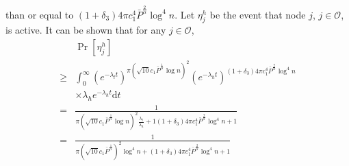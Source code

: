 \documentclass[english]{IEEEtran}
\theoremstyle{plain}
\theoremstyle{plain}
\theoremstyle{plain}
\theoremstyle{remark}
\begin{document}
than or equal to $\left(1+\delta_{3}\right)4\pi c_{1}^{4}\bar{P}^{\frac{2}{\alpha}}\log^{4}n$.
Let $\eta_{j}^{h}$ be the event that node $j$, $j\in\mathcal{O}$,
is active. It can be shown that for any $j\in\mathcal{O}$,
\begin{align}
 & \Pr\left[\eta_{j}^{h}\right]\nonumber \\
\geq & \int_{0}^{\infty}\left(e^{-\lambda_{l}t}\right)^{\pi\left(\sqrt{10}c_{1}\bar{P}^{\frac{1}{\alpha}}\log n\right)^{2}}\left(e^{-\lambda_{h}t}\right)^{\left(1+\delta_{3}\right)4\pi c_{1}^{4}\bar{P}^{\frac{2}{\alpha}}\log^{4}n}\nonumber \\
 & \times\lambda_{h}e^{-\lambda_{h}t}\mathrm{d}t\nonumber \\
= & \frac{1}{\pi\left(\sqrt{10}c_{1}\bar{P}^{\frac{1}{\alpha}}\log n\right)^{2}\frac{\lambda_{l}}{\lambda_{h}}+1\left(1+\delta_{3}\right)4\pi c_{1}^{4}\bar{P}^{\frac{2}{\alpha}}\log^{4}n+1}\nonumber \\
= & \frac{1}{\pi\left(\sqrt{10}c_{1}\bar{P}^{\frac{1}{\alpha}}\right)^{2}\log^{4}n+\left(1+\delta_{3}\right)4\pi c_{1}^{4}\bar{P}^{\frac{2}{\alpha}}\log^{4}n+1}\label{eq:transmission opportunities of high power links}
\end{align}
 
\end{document}

